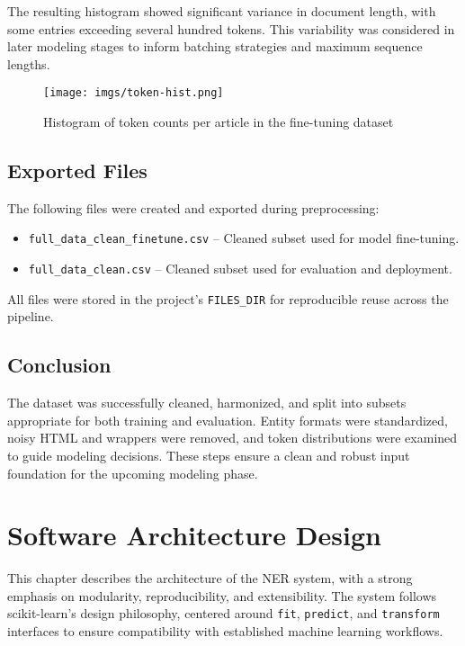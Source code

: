The resulting histogram showed significant variance in document length, with some entries exceeding several hundred tokens. This variability was considered in later modeling stages to inform batching strategies and maximum sequence lengths.

\begin{figure}[h]
  \centering
  \texttt{[image: imgs/token-hist.png]}
  \caption{Histogram of token counts per article in the fine-tuning dataset}
  \label{fig:token-hist}
\end{figure}

\section{Exported Files}

The following files were created and exported during preprocessing:

\begin{itemize}
  \item \texttt{full\_data\_clean\_finetune.csv} – Cleaned subset used for model fine-tuning.
  \item \texttt{full\_data\_clean.csv} – Cleaned subset used for evaluation and deployment.
\end{itemize}

All files were stored in the project’s \texttt{FILES\_DIR} for reproducible reuse across the pipeline.

\section{Conclusion}

The dataset was successfully cleaned, harmonized, and split into subsets appropriate for both training and evaluation. Entity formats were standardized, noisy HTML and wrappers were removed, and token distributions were examined to guide modeling decisions. These steps ensure a clean and robust input foundation for the upcoming modeling phase.

\chapter{Software Architecture Design}
\label{ch:Software-Architecture}

This chapter describes the architecture of the NER system, with a strong emphasis on modularity, reproducibility, and extensibility. The system follows scikit-learn’s design philosophy, centered around \texttt{fit}, \texttt{predict}, and \texttt{transform} interfaces to ensure compatibility with established machine learning workflows.

